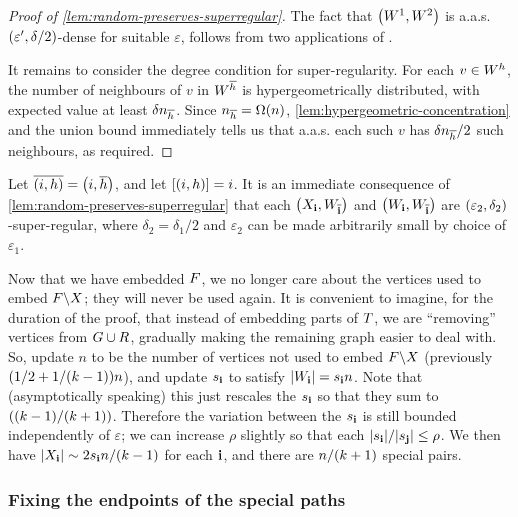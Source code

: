 \documentclass[11pt,english]{article}
\theoremstyle{plain}
\theoremstyle{plain}
\theoremstyle{plain}
\theoremstyle{plain}
\theoremstyle{plain}
\theoremstyle{definition}
\theoremstyle{definition}
\theoremstyle{remark}
\theoremstyle{remark}
\theoremstyle{plain}
\theoremstyle{definition}
\theoremstyle{definition}
\theoremstyle{plain}
\theoremstyle{plain}
\theoremstyle{plain}
\theoremstyle{plain}
\theoremstyle{remark}
\theoremstyle{plain}
\theoremstyle{definition}
\let\originalleft\left
\let\originalright\right
\renewcommand{\left}{\mathopen{}\mathclose\bgroup\originalleft}
\renewcommand{\right}{\aftergroup\egroup\originalright}
\begin{document}
\begin{proof}[Proof of \ref{lem:random-preserves-superregular}]
The fact that $\left(W^{1},W^{2}\right)$ is a.a.s. $\left(\varepsilon',\delta/2\right)$-dense
for suitable $\varepsilon$, follows from two applications of \cite[Theorem~3.6]{GKRS07}.

It remains to consider the degree condition for super-regularity.
For each $v\in W^{h}$, the number of neighbours of $v$ in $W^{\overline{h}}$
is hypergeometrically distributed, with expected value at least $\delta n_{\overline{h}}$.
Since $n_{\flip h}=\Omega\left(n\right)$, \ref{lem:hypergeometric-concentration} and the union
bound immediately tells us that a.a.s. each such $v$ has $\delta n_{\overline{h}}/2$
such neighbours, as required.
\end{proof}
Let $\flip{\left(i,\h\right)}=\left(i,\flip{\h}\right)$, and let
$\left[\left(i,\h\right)\right]=i$. It is an immediate consequence
of \ref{lem:random-preserves-superregular} that each $\left(X_{\bi},W_{\flip{\bi}}\right)$
and $\left(W_{\bi},W_{\flip{\bi}}\right)$ are $\left(\varepsilon_{2},\delta_{2}\right)$-super-regular,
where $\delta_{2}=\delta_{1}/2$ and $\varepsilon_{2}$ can be made
arbitrarily small by choice of $\varepsilon_{1}$.

Now that we have embedded $F$, we no longer care about the vertices
used to embed $F\backslash X$; they will never be used again. It
is convenient to imagine, for the duration of the proof, that instead
of embedding parts of $T$, we are ``removing'' vertices from $G\cup R$,
gradually making the remaining graph easier to deal with. So, update
$n$ to be the number of vertices not used to embed $F\backslash X$
(previously $\left(1/2+1/\left(k-1\right)\right)n$), and update $s_{\mathbf{i}}$
to satisfy $\left|W_{\bi}\right|=s_{\bi}n$. Note that (asymptotically
speaking) this just rescales the $s_{\mathbf{i}}$ so that they sum to $\left(\left(k-1\right)/\left(k+1\right)\right)$.
Therefore the variation between the $s_{\mathbf{i}}$ is still bounded independently
of $\varepsilon$; we can increase $\rho$ slightly so that each $\left|s_{\bi}\right|/\left|s_{\bj}\right|\le\rho$.
We then have $\left|X_{\bi}\right|\sim2s_{\bi}n/\left(k-1\right)$
for each $\mathbf{i}$, and there are $n/\left(k+1\right)$ special pairs.


\subsubsection{\label{sub:fix-endpoints}Fixing the endpoints of the special paths}
\end{document}
